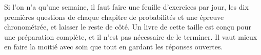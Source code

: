 Si l'on n'a qu'une semaine, il faut faire une feuille d'exercices par jour, les dix premières questions de chaque chapitre de probabilités et une épreuve chronométrée, et laisser le reste de côté. Un livre de cette taille est conçu pour une préparation complète, et il n'est pas nécessaire de le terminer. Il vaut mieux en faire la moitié avec soin que tout en gardant les réponses ouvertes.
